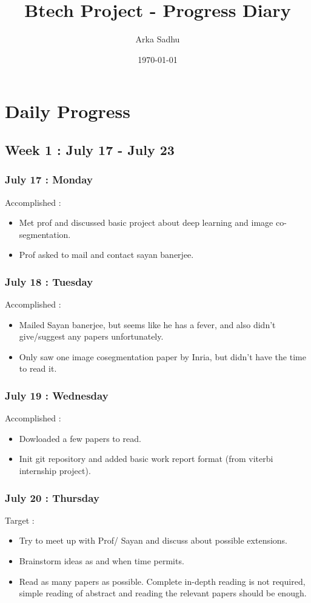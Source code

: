 \documentclass{article}
\title{Btech Project - Progress Diary}
\author{
  Arka Sadhu}
\date{\today}
\begin{document}
\maketitle

\tableofcontents
\newpage
\section{Daily Progress}
\subsection{Week 1 : July 17 - July 23}
\subsubsection{July 17 : Monday}
Accomplished :
\begin{itemize}
\item Met prof and discussed basic project about deep learning and image co-segmentation.
\item Prof asked to mail and contact sayan banerjee.
\end{itemize}

\subsubsection{July 18 : Tuesday}
Accomplished :
\begin{itemize}
\item Mailed Sayan banerjee, but seems like he has a fever, and also didn't give/suggest any papers unfortunately.
\item Only saw one image cosegmentation paper by Inria, but didn't have the time to read it.
\end{itemize}

\subsubsection{July 19 : Wednesday}
Accomplished :
\begin{itemize}
\item Dowloaded a few papers to read.
\item Init git repository and added basic work report format (from viterbi internship project).
\end{itemize}

\subsubsection{July 20 : Thursday}
Target :
\begin{itemize}
\item Try to meet up with Prof/ Sayan and discuss about possible extensions.
\item Brainstorm ideas as and when time permits.
\item Read as many papers as possible. Complete in-depth reading is not required, simple reading of abstract and reading the relevant papers should be enough.
\end{itemize}
\end{document}
